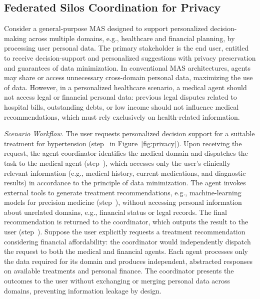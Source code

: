 \documentclass[sigconf,nonacm]{acmart}
\begin{document}
\subsection{Federated Silos Coordination for Privacy}
Consider a general-purpose MAS designed to support personalized decision-making across multiple domains, e.g., healthcare and financial planning, by processing user personal data.
The primary stakeholder is the end user, entitled to receive decision-support and personalized suggestions with privacy preservation and guarantees of data minimization.
In conventional MAS architectures, agents may share or access unnecessary cross-domain personal data, maximizing the use of data.
However, in a personalized healthcare scenario, a medical agent should not access legal or financial personal data: previous legal disputes related to hospital bills, outstanding debts, or low income should not influence medical recommendations, which must rely exclusively on health-related information.

\textit{Scenario Workflow.}
The user requests personalized decision support for a suitable treatment for hypertension (step~ in Figure~\ref{fig:privacy}).
Upon receiving the request, the agent coordinator identifies the medical domain and dispatches the task to the medical agent (step~), which accesses only the user's clinically relevant information (e.g., medical history, current medications, and diagnostic results) in accordance to the principle of data minimization.
The agent invokes external tools to generate treatment recommendations, e.g., machine-learning models for precision medicine (step~), without accessing personal information about unrelated domains, e.g., financial status or legal records.
The final recommendation is returned to the coordinator, which outputs the result to the user (step~).
Suppose the user explicitly requests a treatment recommendation considering financial affordability: the coordinator would independently dispatch the request to both the medical and financial agents.
Each agent processes only the data required for its domain and produces independent, abstracted responses on available treatments and personal finance.
The coordinator presents the outcomes to the user without exchanging or merging personal data across domains, preventing information leakage by design.
\end{document}

